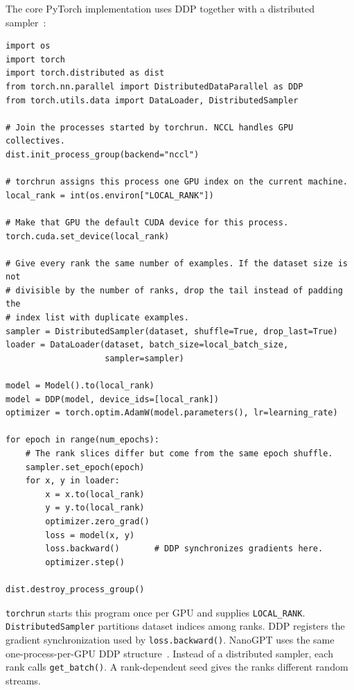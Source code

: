\documentclass[11pt]{article}
\begin{document}
\noindent\begin{minipage}{\textwidth}
The core PyTorch implementation uses DDP together with a distributed
sampler~\cite{pytorch-ddp,pytorch-distributed-sampler}:

\begin{lstlisting}[basicstyle=\ttfamily\footnotesize]
import os
import torch
import torch.distributed as dist
from torch.nn.parallel import DistributedDataParallel as DDP
from torch.utils.data import DataLoader, DistributedSampler

# Join the processes started by torchrun. NCCL handles GPU collectives.
dist.init_process_group(backend="nccl")

# torchrun assigns this process one GPU index on the current machine.
local_rank = int(os.environ["LOCAL_RANK"])

# Make that GPU the default CUDA device for this process.
torch.cuda.set_device(local_rank)

# Give every rank the same number of examples. If the dataset size is not
# divisible by the number of ranks, drop the tail instead of padding the
# index list with duplicate examples.
sampler = DistributedSampler(dataset, shuffle=True, drop_last=True)
loader = DataLoader(dataset, batch_size=local_batch_size,
                    sampler=sampler)

model = Model().to(local_rank)
model = DDP(model, device_ids=[local_rank])
optimizer = torch.optim.AdamW(model.parameters(), lr=learning_rate)

for epoch in range(num_epochs):
    # The rank slices differ but come from the same epoch shuffle.
    sampler.set_epoch(epoch)
    for x, y in loader:
        x = x.to(local_rank)
        y = y.to(local_rank)
        optimizer.zero_grad()
        loss = model(x, y)
        loss.backward()       # DDP synchronizes gradients here.
        optimizer.step()

dist.destroy_process_group()
\end{lstlisting}
\end{minipage}

\texttt{torchrun} starts this program once per GPU and supplies
\texttt{LOCAL\_RANK}. \texttt{DistributedSampler} partitions dataset indices
among ranks. DDP registers the gradient synchronization used by
\texttt{loss.backward()}. NanoGPT uses the same one-process-per-GPU DDP
structure~\cite{karpathy-nanogpt}. Instead of a distributed sampler, each rank
calls \texttt{get\_batch()}. A rank-dependent seed gives the ranks different
random streams.
\end{document}
